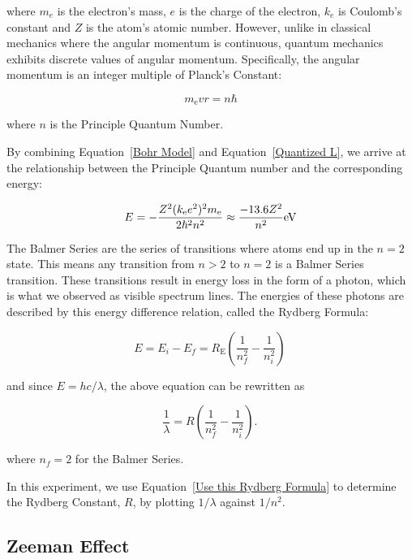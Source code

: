 where $m_e$ is the electron's mass, $e$ is the charge of the electron, $k_e$ is Coulomb's constant and $Z$ is the atom's atomic number. However, unlike in classical mechanics where the angular momentum is continuous, quantum mechanics exhibits discrete values of angular momentum. Specifically, the angular momentum is an integer multiple of Planck's Constant:

\begin{equation}
     m_\mathrm{e} v r = n \hbar 
   \label{Quantized L}
\end{equation}

where $n$ is the Principle Quantum Number. 

By combining Equation~\ref{Bohr Model} and Equation~\ref{Quantized L}, we arrive at the relationship between the Principle Quantum number and the corresponding energy:

\begin{equation}
      E = - { Z^2(k_\mathrm{e} e^2)^2 m_\mathrm{e} \over 2\hbar^2 n^2} \approx {-13.6Z^2 \over n^2}\mathrm{eV}
   \label{Energy Level for nth Level}
\end{equation} 

The Balmer Series are the series of transitions where atoms end up in the $n = 2$ state. This means any transition from $n > 2$ to $n = 2$ is a Balmer Series transition. These transitions result in energy loss in the form of a photon, which is what we observed as visible spectrum lines. The energies of these photons are described by this energy difference relation, called the Rydberg Formula:

\begin{equation} 
    E=E_i-E_f=R_\mathrm{E} \left( \frac{1}{n_{f}^2} - \frac{1}{n_{i}^2} \right) \,
  \label{Rydberg Forumla}
\end{equation}

and since $ E = hc / \lambda $, the above equation can be rewritten as 

\begin{equation} 
    \frac{1}{\lambda}=R \left( \frac{1}{n_{f}^2} - \frac{1}{n_{i}^2} \right). \,
  \label{Use this Rydberg Formula}
\end{equation}

where $n_{f} = 2$ for the Balmer Series.

In this experiment, we use Equation~\ref{Use this Rydberg Formula} to determine the Rydberg Constant, $R$, by plotting $1 / \lambda$ against $1 / n^{2} $.

\subsection{Zeeman Effect}

